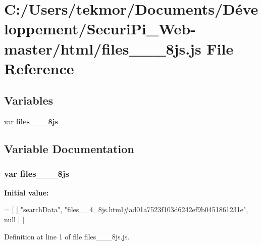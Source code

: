 \section{C\+:/\+Users/tekmor/\+Documents/\+Développement/\+Securi\+Pi\+\_\+\+Web-\/master/html/files\+\_\+\+\_\+\_\+8js.js File Reference}
\label{files____4__8js_8js}
\subsection*{Variables}
\begin{DoxyCompactItemize}
\item 
var {\bf files\+\_\+\+\_\+\_\+8js}
\end{DoxyCompactItemize}


\subsection{Variable Documentation}
\subsubsection[{files\+\_\+\+\_\+4\+\_\+8js}]{\setlength{\rightskip}{0pt plus 5cm}var files\+\_\+\+\_\+\_\+8js}\label{files____4__8js_8js_a484fa1f785cc80254e40d8f482617cb0}
{\bfseries Initial value\+:}
\begin{DoxyCode}
=
[
    [ \textcolor{stringliteral}{"searchData"}, \textcolor{stringliteral}{"files\_\_4\_8js.html#ad01a7523f103d6242ef9b0451861231e"}, null ]
]
\end{DoxyCode}


Definition at line 1 of file files\+\_\+\+\_\+\_\+8js.\+js.

